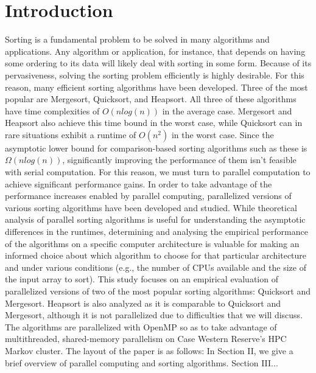 \documentclass[conference]{IEEEtran}
\begin{document}
\section{Introduction}
Sorting is a fundamental problem to be solved in many algorithms and applications.
Any algorithm or application, for instance, that depends on having some ordering to its data will likely deal with sorting in some form. Because of its pervasiveness, solving the sorting problem efficiently is highly desirable. For this reason, many efficient sorting algorithms have been developed. Three of the most popular are Mergesort, Quicksort, and Heapsort. All three of these algorithms have time complexities of $O(nlog(n))$ in the average case. Mergesort and Heapsort also achieve this time bound in the worst case, while Quicksort can in rare situations exhibit a runtime of $O(n^2)$ in the worst case. Since the asymptotic lower bound for comparison-based sorting algorithms such as these is $\Omega(nlog(n))$, significantly improving the performance of them isn't feasible with serial computation. For this reason, we must turn to parallel computation to achieve significant performance gains. In order to take advantage of the performance increases enabled by parallel computing, parallelized versions of various sorting algorithms have been developed and studied. While theoretical analysis of parallel sorting algorithms is useful for understanding the asymptotic differences in the runtimes, determining and analysing the empirical performance of the algorithms on a specific computer architecture is valuable for making an informed choice about which algorithm to choose for that particular architecture and under various conditions (e.g., the number of CPUs available and the size of the input array to sort).
This study focuses on an empirical evaluation of parallelized versions of two of the most popular sorting algorithms: Quicksort and Mergesort. Heapsort is also analyzed as it is comparable to Quicksort and Mergesort, although it is not parallelized due to difficulties that we will discuss. The algorithms are parallelized with OpenMP so as to take advantage of multithreaded, shared-memory parallelism on Case Western Reserve's HPC Markov cluster.
The layout of the paper is as follows: In Section II, we give a brief overview of parallel computing and sorting algorithms. Section III...
\end{document}
